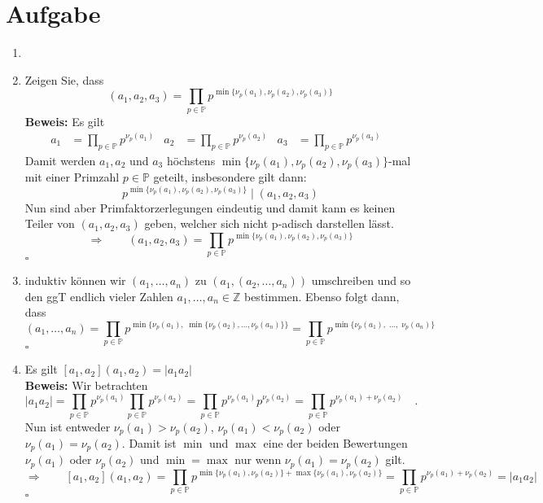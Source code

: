 \documentclass[12pt, a4paper]{article}
\newcommand{\ex}{\section{Aufgabe}}
\renewcommand{\P}{\mathbb{P}}
\begin{document}
	\ex
		\begin{enumerate}[label=\alph*), labelwidth=!, labelindent=0pt]
			\item
			\item Zeigen Sie, dass
				\[
					(a_1, a_2, a_3) = \prod_{p\in\P} p^{\min\{\nu_p(a_1), \nu_p(a_2), \nu_p(a_3)\}}
				\]
				\textbf{Beweis:} Es gilt
				\begin{align*}
					a_1 &= \prod_{p\in\P} p^{\nu_p(a_1)} & a_2 &= \prod_{p\in\P} p^{\nu_p(a_2)} &a_3 &= \prod_{p\in\P} p^{\nu_p(a_3)} &
				\end{align*}
				Damit werden $a_1, a_2$ und $a_3$ höchstens $\min\{\nu_p(a_1), \nu_p(a_2), \nu_p(a_3)\}$-mal mit einer Primzahl $p \in \P$ geteilt, insbesondere gilt dann:
				\[
					p^{\min\{\nu_p(a_1), \nu_p(a_2), \nu_p(a_3)\}} \mid (a_1, a_2, a_3)
				\]
				Nun sind aber Primfaktorzerlegungen eindeutig und damit kann es keinen Teiler  von  $(a_1,a_2,a_3)$ geben, welcher sich nicht p-adisch darstellen lässt.
				\[
					\Rightarrow \qquad (a_1, a_2, a_3) = \prod_{p\in\P} p^{\min\{\nu_p(a_1), \nu_p(a_2), \nu_p(a_3)\}}
				\] \hfill $\square$
				\item induktiv können wir $(a_1, \dots, a_n)$ zu $(a_1, (a_2, \dots, a_n))$ umschreiben und so den ggT endlich vieler Zahlen $a_1,\dots,a_n \in \mathbb{Z}$ bestimmen. Ebenso folgt dann, dass
				\[
					(a_1, \dots, a_n) = \prod_{p\in\P}p^{\min\{\nu_p(a_1),\;\min\{\nu_p(a_2), \dots, \nu_p(a_n)\}\}} = \prod_{p\in\P}p^{\min\{\nu_p(a_1),\;\dots,\;\nu_p(a_n)\}}
				\] \hfill $\square$
				\item Es gilt $[a_1,a_2](a_1,a_2) = |a_1a_2|$\\
				\textbf{Beweis:} Wir betrachten
				\[
					|a_1a_2| = \prod_{p\in\P}p^{\nu_p(a_1)}\prod_{p\in\P}p^{\nu_p(a_2)} = \prod_{p\in\P}p^{\nu_p(a_1)}p^{\nu_p(a_2)} = \prod_{p\in\P}p^{\nu_p(a_1)+\nu_p(a_2)} \quad.
				\]
				Nun ist entweder $\nu_p(a_1) > \nu_p(a_2)$, $\nu_p(a_1) < \nu_p(a_2)$ oder $\nu_p(a_1) = \nu_p(a_2)$. Damit ist $\min$ und $\max$ eine der beiden Bewertungen $\nu_p(a_1)$ oder $\nu_p(a_2)$ und $\min = \max$ nur wenn $\nu_p(a_1) = \nu_p(a_2)$ gilt.
				\[
					\Rightarrow \qquad [a_1,a_2](a_1,a_2) = \prod_{p\in\P}p^{\min\{\nu_p(a_1),\nu_p(a_2)\}+\max\{\nu_p(a_1),\nu_p(a_2)\}} =  \prod_{p\in\P}p^{\nu_p(a_1)+\nu_p(a_2)} = |a_1a_2|
				\]  \hfill $\square$
		\end{enumerate}

\newpage
\end{document}
